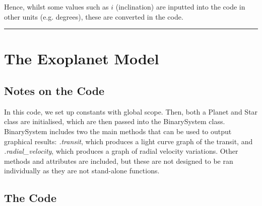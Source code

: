 \documentclass[11pt]{article}
\begin{document}
Hence, whilst some values such as \(i\) (inclination) are inputted into
the code in other units (e.g. degrees), these are converted in the code.

\begin{center}\rule{0.5\linewidth}{0.5pt}\end{center}
    \hypertarget{the-exoplanet-model}{%
\section{The Exoplanet Model}\label{the-exoplanet-model}}

\hypertarget{notes-on-the-code}{%
\subsection{Notes on the Code}\label{notes-on-the-code}}

In this code, we set up constants with global scope. Then, both a Planet
and Star class are initialised, which are then passed into the
BinarySystem class. BinarySystem includes two the main methods that can
be used to output graphical results: \emph{.transit}, which produces a
light curve graph of the transit, and \emph{.radial\_velocity}, which
produces a graph of radial velocity variations. Other methods and
attributes are included, but these are not designed to be ran
individually as they are not stand-alone functions.

\hypertarget{the-code}{%
\subsection{The Code}\label{the-code}}
\end{document}
